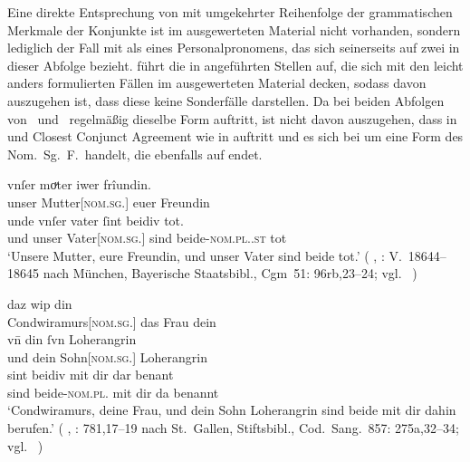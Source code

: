 Eine direkte Entsprechung von  mit umgekehrter
Reihenfolge der grammatischen Merkmale
der Konjunkte ist im ausgewerteten Material nicht vorhanden, sondern lediglich
der Fall mit  als  eines
Personalpronomens, das sich seinerseits auf zwei
 in dieser Abfolge bezieht. \citet[96, 145]{askedal1973} führt
die in  angeführten Stellen auf, die sich mit den leicht
anders formulierten Fällen im ausgewerteten Material decken,
sodass davon auszugehen ist, dass diese keine Sonderfälle darstellen. Da bei
beiden Abfolgen von \MascM\ und \FemF\ regelmäßig dieselbe Form 
auftritt, ist nicht davon auszugehen, dass in  und
 Closest Conjunct Agreement
wie in  auftritt und es sich bei  um eine Form des
Nom.~Sg.~F.\ handelt, die ebenfalls auf  endet.

\begin{exe}
	\ex \label{ex:askfmbeidiu}
		\begin{xlist}
		\ex \gll vnſer moͮter iwer frîundin. \\
				unser Mutter[\textsc{nom.sg.\FemF}] euer Freundin \\
		\sn \gll unde vnſer vater ſint beidiv tot. \\
				und unser Vater[\textsc{nom.sg.\MascM}] sind
				beide-\textsc{nom.pl.\NeutMF.st} tot \\
			\trans `Unsere Mutter, eure Freundin, und unser Vater sind beide
				tot.'
				(%
					, : V.~18644--18645
					nach München, Bayerische Staatsbibl., Cgm~51: 96rb,23--24;
					vgl.~\cite[259]{maroldschroeder1969}%
				)
			\label{ex:askfmbeidiu_1}
	
		\ex {} daz wip din \\
				Condwiramurs[\textsc{nom.sg.\FemF}] das Frau dein \\
		\sn \gll vn̄ din ſvn Loherangrin \\
				und dein Sohn[\textsc{nom.sg.\MascM}] Loherangrin \\
		\sn \gll sint beidiv mit dir dar benant \\
				sind beide-\textsc{nom.pl.\NeutMF} mit dir da benannt \\
		\trans `Condwiramurs, deine Frau, und dein Sohn Loherangrin
			sind beide mit dir dahin berufen.'
			(%
				, : 781,17--19
				nach St.~Gallen, Stiftsbibl., Cod.~Sang.~857: 275a,32--34;
				vgl.~\cite[785]{knechtschirok2003}%
			)
			\label{ex:askfmbeidiu_2}
	\end{xlist}
\end{exe}

